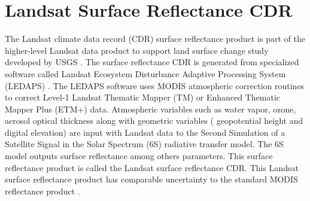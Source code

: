 
\section{Landsat Surface Reflectance CDR}
\label{sec:CDR} 
The Landsat climate data record (CDR) surface reflectance product is part of the higher-level Landsat data product to support land surface change study developed by USGS \cite{LandsatCDR}. The surface reflectance CDR is generated from specialized software called Landsat Ecosystem Disturbance Adaptive Processing System (LEDAPS) \cite{Masek:2006}. The LEDAPS software uses MODIS atmospheric correction routines to correct Level-1 Landsat Thematic Mapper (TM) or Enhanced Thematic Mapper Plus (ETM+) data. Atmospheric variables such as water vapor, ozone, aerosol optical thickness along with geometric variables ({ geopotential height} and digital elevation) are input with Landsat data to the Second Simulation of a Satellite Signal in the Solar Spectrum (6S) radiative transfer model. The 6S model outputs surface reflectance among others parameters. This surface reflectance product is called the Landsat surface reflectance CDR. This Landsat surface reflectance product has comparable uncertainty to the standard MODIS reflectance product \cite{Masek:2006}.

